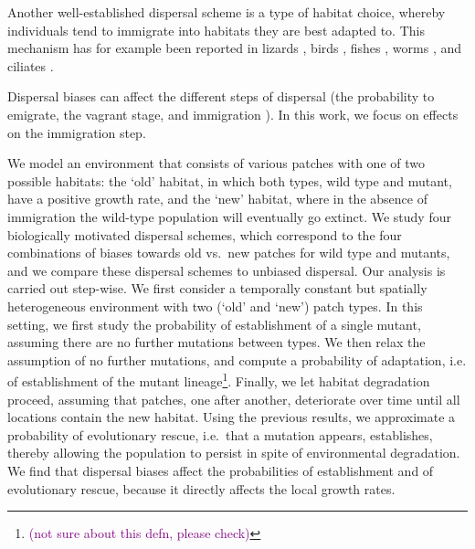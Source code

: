 \documentclass[a4paper,11pt]{article}
\newcommand{\florence}[1]{\textcolor{purple}{(#1)}} %
\newcommand{\chg}[1]{\textcolor{change}{#1}}
\begin{document}
Another well-established dispersal scheme is a type of habitat choice, whereby individuals tend to immigrate into habitats they are best adapted to. This mechanism has for example been reported in lizards \citep{bestion_2015}, birds \citep{dreiss_2011,benkman_2017}, fishes \citep{bolnick_2009}, worms \citep{mathieu_2010}, and ciliates \citep{jacob_2017,jacob_2018}. 

 Dispersal biases can affect the different steps of dispersal (the probability to emigrate, the vagrant stage, and immigration \citep{bowler_2005,ronce_2007}). In this work, we focus on effects on the immigration step. 

We model an environment that consists of various patches with one of two possible habitats: the `old' habitat, in which both \chg{types, wild type and mutant, have a positive growth rate}, and the `new' habitat, where in the absence of immigration the wild-type population will eventually go extinct. We study four biologically motivated dispersal schemes, which correspond to the four combinations of biases towards old vs.\ new patches for wild type and mutants, and we compare these dispersal schemes to \chg{unbiased} dispersal. Our analysis is carried out step-wise. We first consider a temporally constant but spatially heterogeneous environment with two (`old' and `new') patch types. In this setting, we first study the probability of establishment of a single mutant, assuming there are no further mutations between types. We then relax the assumption of no further mutations, and compute a probability of adaptation, i.e. of establishment of the mutant lineage\footnote{\florence{not sure about this defn, please check}}. Finally, we let habitat degradation proceed, assuming that patches, one after \chg{another}, deteriorate over time until all locations contain the new habitat. Using the previous results, we approximate a probability of evolutionary rescue, i.e.\ that a mutation appears, establishes, thereby allowing the population to persist in spite of environmental degradation. We find that dispersal biases affect the probabilities of establishment and of evolutionary rescue, because it directly affects the local growth rates. 

\end{document}
